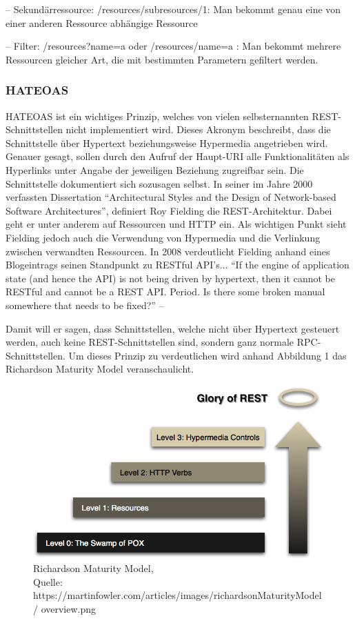 –	Sekundärressource: /resources/subresources/1:	Man bekommt genau eine von einer anderen Ressource abhängige Ressource

–	Filter: /resources?name=a oder /resources/name=a : Man bekommt mehrere Ressourcen gleicher Art, die mit bestimmten Parametern gefiltert werden.

\subsubsection{HATEOAS}
\label{sec:RESTHATEOAS}

HATEOAS ist ein wichtiges Prinzip, welches von vielen selbsternannten \ac{REST}-Schnittstellen
nicht implementiert wird. Dieses Akronym beschreibt, dass die Schnittstelle über Hypertext
beziehungsweise Hypermedia angetrieben wird. Genauer gesagt, sollen durch den Aufruf
der Haupt-\ac{URI} alle Funktionalitäten als Hyperlinks unter Angabe der jeweiligen Beziehung
zugreifbar sein. Die Schnittstelle dokumentiert sich sozusagen selbst.
In seiner im Jahre 2000 verfassten Dissertation “Architectural Styles and the Design of
Network-based Software Architectures”, definiert Roy Fielding die \ac{REST}-Architektur. Dabei
geht er unter anderem auf Ressourcen und \ac{HTTP} ein. Als wichtigen Punkt sieht Fielding
jedoch auch die Verwendung von Hypermedia und die Verlinkung zwischen verwandten Ressourcen.
In 2008 verdeutlicht Fielding anhand eines Blogeintrags seinen Standpunkt zu \ac{REST}ful API's...
“If the engine of application state (and hence the API) is not being driven by hypertext, then
it cannot be RESTful and cannot be a REST API. Period. Is there some broken manual
somewhere that needs to be fixed?” – \cite{.19.03.2017}

Damit will er sagen, dass Schnittstellen, welche nicht über Hypertext gesteuert werden, auch
keine \ac{REST}-Schnittstellen sind, sondern ganz normale \ac{RPC}-Schnittstellen.
Um dieses Prinzip zu verdeutlichen wird anhand Abbildung 1 das Richardson Maturity Model
veranschaulicht.
 
\begin{figure}[!htb]
	\centering
	\includegraphics[scale=0.5]{hateoas.png}
	\caption[Richardson Maturity Model]{Richardson Maturity Model,\\ Quelle: https://martinfowler.com/articles/images/richardsonMaturityModel/ overview.png}
\end{figure}
 


